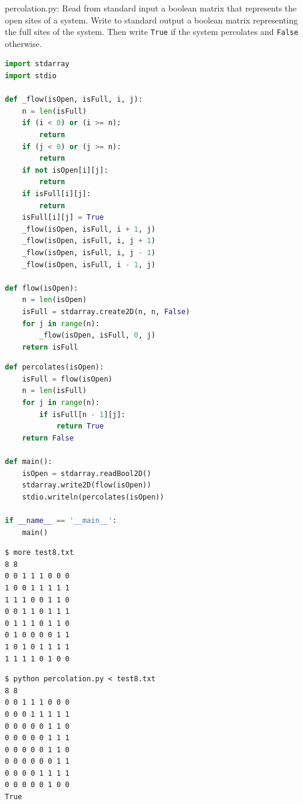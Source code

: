 \documentclass[8pt,a4paper,compress]{beamer}
\begin{document}
\begin{frame}[fragile]
\pause

\begin{framed}
\tiny percolation.py: Read from standard input a boolean matrix that represents the open sites of a system. Write to standard output a boolean matrix representing the full sites of the system. Then write \lstinline{True} if the system percolates and \lstinline{False} otherwise.

\end{framed}

\begin{lstlisting}[language=Python]
import stdarray
import stdio

def _flow(isOpen, isFull, i, j):
    n = len(isFull)
    if (i < 0) or (i >= n):
        return
    if (j < 0) or (j >= n):
        return
    if not isOpen[i][j]:
        return
    if isFull[i][j]:
        return
    isFull[i][j] = True
    _flow(isOpen, isFull, i + 1, j)
    _flow(isOpen, isFull, i, j + 1)
    _flow(isOpen, isFull, i, j - 1)
    _flow(isOpen, isFull, i - 1, j)

def flow(isOpen):
    n = len(isOpen)
    isFull = stdarray.create2D(n, n, False)
    for j in range(n):
        _flow(isOpen, isFull, 0, j)
    return isFull
\end{lstlisting}
\end{frame}

\begin{frame}[fragile]
\pause

\begin{lstlisting}[language=Python]
def percolates(isOpen):
    isFull = flow(isOpen)
    n = len(isFull)
    for j in range(n):
        if isFull[n - 1][j]:
            return True
    return False

def main():
    isOpen = stdarray.readBool2D()
    stdarray.write2D(flow(isOpen))
    stdio.writeln(percolates(isOpen))

if __name__ == '__main__':
    main()
\end{lstlisting}
\end{frame}

\begin{frame}[fragile]
\pause

\begin{lstlisting}[language={}]
$ more test8.txt 
8 8
0 0 1 1 1 0 0 0
1 0 0 1 1 1 1 1
1 1 1 0 0 1 1 0
0 0 1 1 0 1 1 1
0 1 1 1 0 1 1 0
0 1 0 0 0 0 1 1
1 0 1 0 1 1 1 1
1 1 1 1 0 1 0 0
\end{lstlisting}

\pause

\begin{lstlisting}[language={}]
$ python percolation.py < test8.txt 
8 8
0 0 1 1 1 0 0 0 
0 0 0 1 1 1 1 1 
0 0 0 0 0 1 1 0 
0 0 0 0 0 1 1 1 
0 0 0 0 0 1 1 0 
0 0 0 0 0 0 1 1 
0 0 0 0 1 1 1 1 
0 0 0 0 0 1 0 0 
True
\end{lstlisting}
\end{frame}
\end{document}
